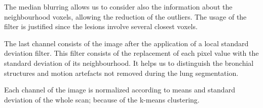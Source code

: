 \documentclass{standalone}
\begin{document}
	The median blurring allows us to consider also the information about the neighbourhood voxels, allowing the reduction of the outliers. The usage of the filter is justified since the lesions involve several closest voxels.

	The last channel consists of the image after the application of a local standard deviation filter. This filter consists of the replacement of each pixel value with the standard deviation of its neighbourhood. It helps us to distinguish the bronchial structures and motion artefacts not removed during the lung segmentation. 

	Each channel of the image is normalized according to means and standard deviation of the whole scan; because of the k-means clustering.
\end{document}
